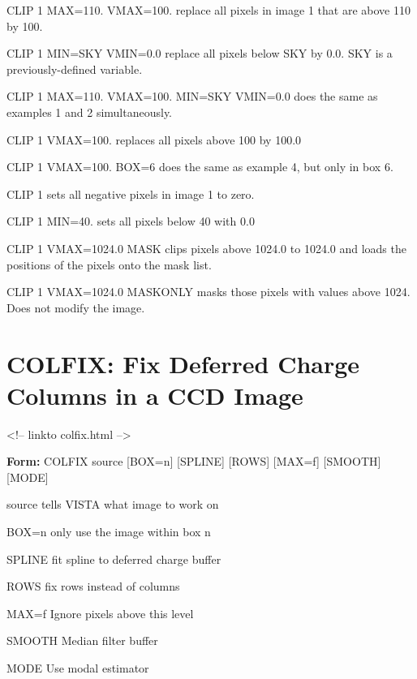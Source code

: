 \begin{example}
  \item[CLIP 1 MAX=110. VMAX=100.\hfill]{replace all pixels in image 1
       that are above 110 by 100.}
  \item[CLIP 1 MIN=SKY VMIN=0.0\hfill]{replace all pixels below SKY
       by 0.0.  SKY is a previously-defined variable.}
  \item[CLIP 1 MAX=110. VMAX=100. MIN=SKY VMIN=0.0\hfill]{
       does the same as examples 1 and 2 simultaneously.}
  \item[CLIP 1 VMAX=100.\hfill]{replaces all pixels above 100 by 100.0}
  \item[CLIP 1 VMAX=100. BOX=6\hfill]{does the same as example 4,
       but only in box 6.}
  \item[CLIP 1\hfill]{sets all negative pixels in image 1 to zero.}
  \item[CLIP 1 MIN=40.\hfill]{sets all pixels below 40 with 0.0}
  \item[CLIP 1 VMAX=1024.0 MASK\hfill]{clips pixels above 1024.0 to
       1024.0 and loads the positions of the pixels onto the mask list.}
  \item[CLIP 1 VMAX=1024.0 MASKONLY\hfill]{masks those pixels with values
       above 1024.  Does not modify the image.}
\end{example}

\section{COLFIX: Fix Deferred Charge Columns in a CCD Image}
\begin{rawhtml}
<!-- linkto colfix.html -->
\end{rawhtml}

\begin{command}
  \item[\textbf{Form: }  COLFIX source {[BOX=n]} {[SPLINE]} {[ROWS]} 
       {[MAX=f]} {[SMOOTH]} {[MODE]}\hfill]{}
  \item[source]{tells VISTA what image to work on}
  \item[BOX=n]{only use the image within box n}
  \item[SPLINE]{fit spline to deferred charge buffer}
  \item[ROWS]{fix rows instead of columns}
  \item[MAX=f]{Ignore pixels above this level}
  \item[SMOOTH]{Median filter buffer}
  \item[MODE]{Use modal estimator}
\end{command}

